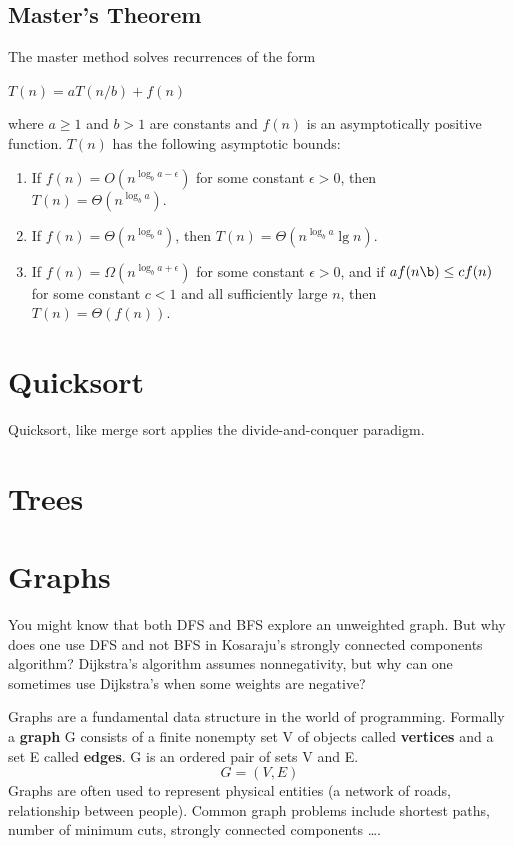 \documentclass[]{book}
\begin{document}
    \section{Master's Theorem}
      The master method solves recurrences of the form
      \begin{flushleft}
        $T(n) = aT(n/b) + f(n)$
      \end{flushleft}
      where $a \geq 1$ and $b > 1$ are constants and $f(n)$ is an asymptotically positive
      function. $T(n)$ has the following asymptotic bounds:
      \begin{enumerate}
        \item If $f(n) = O(n^{\log_b a-\epsilon})$ for some constant $\epsilon > 0$,
        then\medskip\\ $T(n) = \Theta(n^{\log_b a})$.
        \item If $f(n) = \Theta(n^{\log_b a})$, then $T(n) = \Theta(n^{\log_b a}\lg n)$.
        \item If $f(n) = \Omega(n^{\log_b a+\epsilon})$ for some constant $\epsilon > 0$, and if
        $af(n\b) \leq cf(n)$ for some constant $c < 1$ and all sufficiently large $n$, then
        $T(n) = \Theta(f(n))$.
      \end{enumerate}
  \chapter{Quicksort}
    Quicksort, like merge sort applies the divide-and-conquer paradigm.
  \chapter{Trees}

  \chapter{Graphs}
  You might know that both DFS and BFS explore an unweighted graph. But why does one use DFS
  and not BFS in Kosaraju's strongly connected components algorithm? Dijkstra's algorithm assumes
  nonnegativity, but why can one sometimes use Dijkstra's when some weights are negative?

  Graphs are a fundamental data structure in the world of programming. Formally
  a \textbf{graph} G consists of a finite nonempty set V of objects called \textbf{vertices}
  and a set E called \textbf{edges}. G is an ordered pair of sets V and E. $$ G = (V,E)$$
  \indent Graphs are often used to represent physical entities (a network of roads, relationship
  between people). Common graph problems include shortest paths, number of minimum cuts,
  strongly connected components \ldots.
\end{document}
